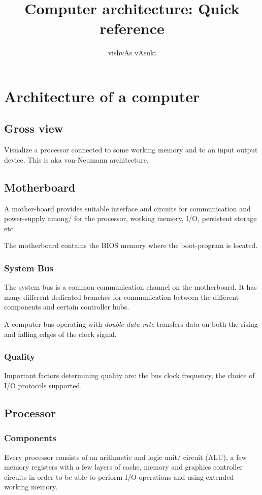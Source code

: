 \documentclass[oneside, article]{memoir}
\title{Computer architecture: Quick reference}
\author{vishvAs vAsuki}
\begin{document}
\maketitle

\chapter{Architecture of a computer}
\section{Gross view}
Visualize a processor connected to some working memory and to an input output device. This is aka von-Neumann architecture.

\section{Motherboard}
A mother-board provides suitable interface and circuits for communication and power-supply among/ for the processor, working memory, I/O, persistent storage etc..

The motherboard contains the BIOS memory where the boot-program is located.

\subsection{System Bus}
The system bus is a common communication channel on the motherboard. It has many different dedicated branches for communication between the different components and certain controller hubs.

A computer bus operating with \textit{double data rate} transfers data on both the rising and falling edges of the clock signal.

\subsection{Quality}
Important factors determining quality are: the bus clock frequency, the choice of I/O protocols supported.

\section{Processor}
\subsection{Components}
Every processor consists of an arithmetic and logic unit/ circuit (ALU), a few memory registers with a few layers of cache, memory and graphics controller circuits in order to be able to perform I/O operations and using extended working memory.
\end{document}
